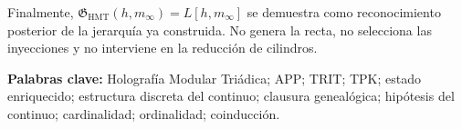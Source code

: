 Finalmente,
\(\mathfrak G_{\mathrm{HMT}}(h,m_\infty)=L[h,m_\infty]\) se demuestra como
reconocimiento posterior de la jerarquía ya construida. No genera la recta,
no selecciona las inyecciones y no interviene en la reducción de cilindros.

\medskip
\noindent\textbf{Palabras clave:} Holografía Modular Triádica; APP; TRIT;
TPK; estado enriquecido; estructura discreta del continuo; clausura
genealógica; hipótesis del continuo; cardinalidad; ordinalidad; coinducción.
\endgroup
